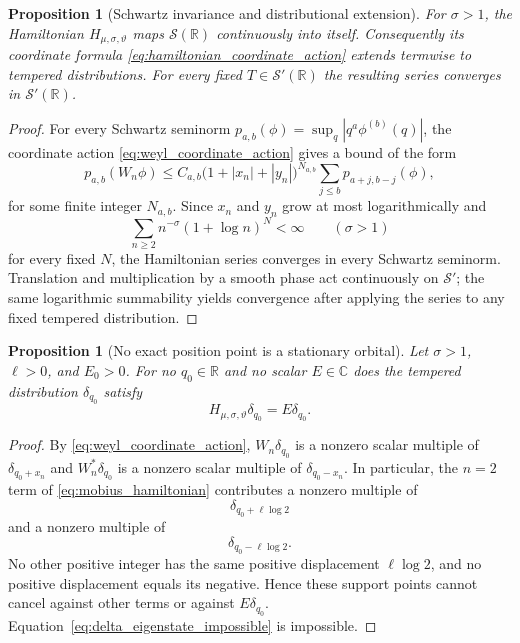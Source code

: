 \documentclass[11pt]{amsart}
\numberwithin{equation}{section}
\theoremstyle{plain}
\newtheorem{proposition}[theorem]{Proposition}
\theoremstyle{definition}
\theoremstyle{remark}
\newcommand{\R}{\mathbb{R}}
\newcommand{\C}{\mathbb{C}}
\newcommand{\Sch}{\mathcal{S}}
\begin{document}
\begin{proposition}[Schwartz invariance and distributional extension]
\label{prop:schwartz_distribution_extension}
For $\sigma>1$, the Hamiltonian $H_{\mu,\sigma,\vartheta}$ maps
$\Sch(\R)$ continuously into itself.  Consequently its coordinate formula
\eqref{eq:hamiltonian_coordinate_action} extends termwise to tempered
distributions.  For every fixed $T\in\Sch'(\R)$ the resulting series
converges in $\Sch'(\R)$.
\end{proposition}

\begin{proof}
For every Schwartz seminorm $p_{a,b}(\phi)=\sup_q|q^a\phi^{(b)}(q)|$,
the coordinate action \eqref{eq:weyl_coordinate_action} gives a bound of the
form
\begin{equation}
p_{a,b}(W_n\phi)
\le
C_{a,b}\bigl(1+|x_n|+|y_n|\bigr)^{N_{a,b}}
\sum_{j\le b}p_{a+j,b-j}(\phi),
\label{eq:weyl_schwartz_bound}
\end{equation}
for some finite integer $N_{a,b}$.  Since $x_n$ and $y_n$ grow at most
logarithmically and
\begin{equation}
\sum_{n\ge2}n^{-\sigma}(1+\log n)^N<\infty
\qquad(\sigma>1)
\label{eq:log_weight_summability}
\end{equation}
for every fixed $N$, the Hamiltonian series converges in every Schwartz
seminorm.  Translation and multiplication by a smooth phase act continuously
on $\Sch'$; the same logarithmic summability yields convergence after
applying the series to any fixed tempered distribution.
\end{proof}

\begin{proposition}[No exact position point is a stationary orbital]
\label{prop:no_delta_eigenstate}
Let $\sigma>1$, $\ell>0$, and $E_0>0$.  For no $q_0\in\R$ and no scalar
$E\in\C$ does the tempered distribution $\delta_{q_0}$ satisfy
\begin{equation}
H_{\mu,\sigma,\vartheta}\delta_{q_0}
=E\delta_{q_0}.
\label{eq:delta_eigenstate_impossible}
\end{equation}
\end{proposition}

\begin{proof}
By \eqref{eq:weyl_coordinate_action}, $W_n\delta_{q_0}$ is a nonzero scalar
multiple of $\delta_{q_0+x_n}$ and $W_n^*\delta_{q_0}$ is a nonzero scalar
multiple of $\delta_{q_0-x_n}$.  In particular, the $n=2$ term of
\eqref{eq:mobius_hamiltonian} contributes a nonzero multiple of
\begin{equation}
\delta_{q_0+\ell\log2}
\label{eq:delta_shift_plus_two}
\end{equation}
and a nonzero multiple of
\begin{equation}
\delta_{q_0-\ell\log2}.
\label{eq:delta_shift_minus_two}
\end{equation}
No other positive integer has the same positive displacement
$\ell\log2$, and no positive displacement equals its negative.  Hence these
support points cannot cancel against other terms or against $E\delta_{q_0}$.
Equation~\eqref{eq:delta_eigenstate_impossible} is impossible.
\end{proof}
\end{document}
